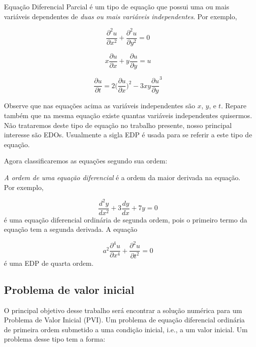 Equação Diferencial Parcial é um tipo de equação que 
possui uma ou mais variáveis dependentes de 
\emph{duas ou mais variáveis independentes}. Por exemplo,

\begin{equation*}
\frac{\partial^{2}u}{\partial x^{2}} + \frac{\partial^{2}u}{\partial y^{2}} = 0
\end{equation*}


\begin{equation*}
x\frac{\partial u}{\partial x} + y\frac{\partial u}{\partial y} = u
\end{equation*}


\begin{equation*}
\frac{\partial u}{\partial t} = 2\biggl(\frac{\partial u}{\partial x}\biggl)^{2} - 3xy\frac{\partial u}{\partial y}^{3}
\end{equation*}

Observe que nas equações acima as variáveis independentes
são $x$, $y$, e $t$. Repare também que na mesma equação existe quantas variáveis
independentes quisermos. Não trataremos deste tipo de equação no trabalho presente,
nosso principal interesse são EDOs. Usualmente a sigla EDP é usada para se referir a este tipo de equação.

Agora classificaremos as equações segundo sua ordem:

\emph{A ordem de uma equação diferencial} é a ordem da maior derivada na equação. Por exemplo,

\begin{equation*}
\frac{d^{2}y}{dx^{2}} + 3\frac{dy}{dx} + 7y = 0
\end{equation*}
é uma equação diferencial ordinária de segunda ordem, pois o primeiro termo
da equação tem a segunda derivada. A equação

\begin{equation*}
a^{2}\frac{\partial^{4}u}{\partial x^{4}} + \frac{\partial^2u}{\partial t^{2}} = 0
\end{equation*}
é uma EDP de quarta ordem.

\subsection{Problema de valor inicial}

O principal objetivo desse trabalho será encontrar a solução numérica para um
Problema de Valor Inicial (PVI). Um problema de equação diferencial ordinária de
primeira ordem submetido a uma condição inicial, i.e., a um valor inicial. Um problema desse tipo
tem a forma:


